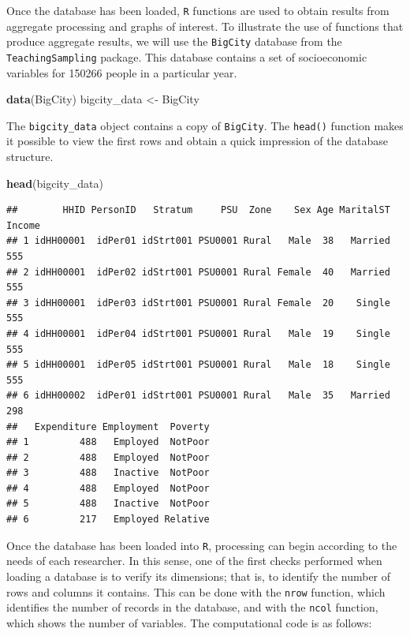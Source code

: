 \documentclass[
  english,
  12pt,
]{book}
\newenvironment{Shaded}{\begin{snugshade}}{\end{snugshade}}
\newcommand{\FunctionTok}[1]{\textcolor[rgb]{0.13,0.29,0.53}{\textbf{#1}}}
\newcommand{\NormalTok}[1]{#1}
\newcommand{\OtherTok}[1]{\textcolor[rgb]{0.56,0.35,0.01}{#1}}
\begin{document}
Once the database has been loaded, \texttt{R} functions are used to obtain results from aggregate processing and graphs of interest. To illustrate the use of functions that produce aggregate results, we will use the \texttt{BigCity} database from the \texttt{TeachingSampling} package. This database contains a set of socioeconomic variables for 150266 people in a particular year.

\begin{Shaded}
\begin{Highlighting}[]
\FunctionTok{data}\NormalTok{(BigCity)}
\NormalTok{bigcity\_data }\OtherTok{\textless{}{-}}\NormalTok{ BigCity}
\end{Highlighting}
\end{Shaded}

The \texttt{bigcity\_data} object contains a copy of \texttt{BigCity}. The \texttt{head()} function makes it possible to view the first rows and obtain a quick impression of the database structure.

\begin{Shaded}
\begin{Highlighting}[]
\FunctionTok{head}\NormalTok{(bigcity\_data)}
\end{Highlighting}
\end{Shaded}

\begin{verbatim}
##        HHID PersonID   Stratum     PSU  Zone    Sex Age MaritalST Income
## 1 idHH00001  idPer01 idStrt001 PSU0001 Rural   Male  38   Married    555
## 2 idHH00001  idPer02 idStrt001 PSU0001 Rural Female  40   Married    555
## 3 idHH00001  idPer03 idStrt001 PSU0001 Rural Female  20    Single    555
## 4 idHH00001  idPer04 idStrt001 PSU0001 Rural   Male  19    Single    555
## 5 idHH00001  idPer05 idStrt001 PSU0001 Rural   Male  18    Single    555
## 6 idHH00002  idPer01 idStrt001 PSU0001 Rural   Male  35   Married    298
##   Expenditure Employment  Poverty
## 1         488   Employed  NotPoor
## 2         488   Employed  NotPoor
## 3         488   Inactive  NotPoor
## 4         488   Employed  NotPoor
## 5         488   Inactive  NotPoor
## 6         217   Employed Relative
\end{verbatim}

Once the database has been loaded into \texttt{R}, processing can begin according to the needs of each researcher. In this sense, one of the first checks performed when loading a database is to verify its dimensions; that is, to identify the number of rows and columns it contains. This can be done with the \texttt{nrow} function, which identifies the number of records in the database, and with the \texttt{ncol} function, which shows the number of variables. The computational code is as follows:
\end{document}
